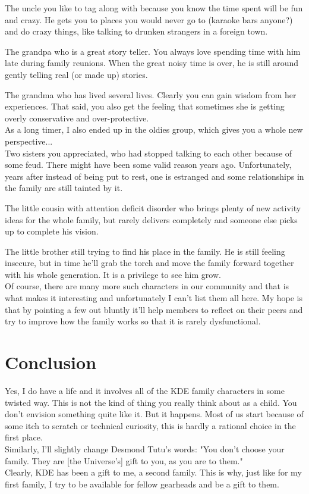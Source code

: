 The uncle you like to tag along with because you know the time spent will be
fun and crazy. He gets you to places you would never go to (karaoke bars anyone?)
and do crazy things, like talking to drunken strangers in a foreign town.

The grandpa who is a great story teller. You always love spending time with him
late during family reunions. When the great noisy time is over, he is still
around gently telling real (or made up) stories.

The grandma who has lived several lives. Clearly you can gain wisdom from her
experiences. That said, you also get the feeling that sometimes she is getting
overly conservative and over-protective. \\

As a long timer, I also ended up in the oldies group, which gives you a whole
new perspective... \\

Two sisters you appreciated, who had stopped talking to each other because of some feud.
There might have been some valid reason years ago. Unfortunately, years after
instead of being put to rest, one is estranged and some relationships in the
family are still tainted by it.

The little cousin with attention deficit disorder who brings plenty of new activity
ideas for the whole family, but rarely delivers completely
and someone else picks up to complete his vision.

The little brother still trying to find his place in the family. He is still
feeling insecure, but in time he'll grab the torch and move the family forward
together with his whole generation. It is a privilege to see him grow. \\

Of course, there are many more such characters in our community and that is what
makes it interesting and unfortunately I can't list them all here. My hope is that
by pointing a few out bluntly it'll help members to reflect on their peers and
try to improve how the family works so that it is rarely dysfunctional.

\section*{Conclusion}
Yes, I do have a life and it involves all of the KDE family characters in some
twisted way. This is not the kind of thing you really think about as a child. You
don't envision something quite like it. But it happens. Most of us start because
of some itch to scratch or technical curiosity, this is hardly a rational choice
in the first place. \\

Similarly, I'll slightly change Desmond Tutu's words: "You don’t choose your
family. They are [the Universe's] gift to you, as you are to them." \\

Clearly, KDE has been a gift to me, a second family. This is why, just like for
my first family, I try to be available for fellow gearheads and be a gift to
them.

